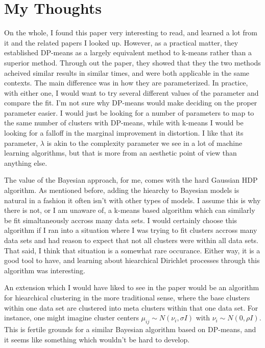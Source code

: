 \documentclass[11pt]{article}
\theoremstyle{definition}
\begin{document}
\section{My Thoughts}
On the whole, I found this paper very interesting to read, and learned a lot from it and the related papers I looked up. However, as a practical matter, they established DP-means as a largely equivalent method to k-means rather than a superior method. Through out the paper, they showed that they the two methods acheived similar results in similar times, and were both applicable in the same contexts. The main difference was in how they are parameterized. In practice, with either one, I would want to try several different values of the parameter and compare the fit. I'm not sure why DP-means would make deciding on the proper parameter easier. I would just be looking for a number of parameters to map to the same number of clusters with DP-means, while with k-means I would be looking for a falloff in the marginal improvement in distortion. I like that its parameter, $\lambda$ is akin to the complexity parameter we see in a lot of machine learning algorithms, but that is more from an aesthetic point of view than anything else. \par
The value of the Bayesian approach, for me, comes with the hard Gaussian HDP algorithm. As mentioned before, adding the hiearchy to Bayesian models is natural in a fashion it often isn't with other types of models. I assume this is why there is not, or I am unaware of, a k-means based algorithm which can similarly be fit simaltaneously accross many data sets. I would certainly choose this algorithm if I ran into a situation where I was trying to fit clusters accross many data sets and had reason to expect that not all clusters were within all data sets. That said, I think that situation is a somewhat rare occurance. Either way, it is a good tool to have, and learning about hiearchical Dirichlet processes through this algorithm was interesting. \par
An extension which I would have liked to see in the paper would be an algorithm for hiearchical clustering in the more traditional sense, where the base clusters within one data set are clustered into meta clusters within that one data set. For instance, one might imagine cluster centers $\mu_{ij}\sim N(\nu_i,\sigma I)$ with $\nu_i\sim N(0,\rho I)$. This is fertile grounds for a similar Bayesian algorithm based on DP-means, and it seems like something which wouldn't be hard to develop.
\end{document}
